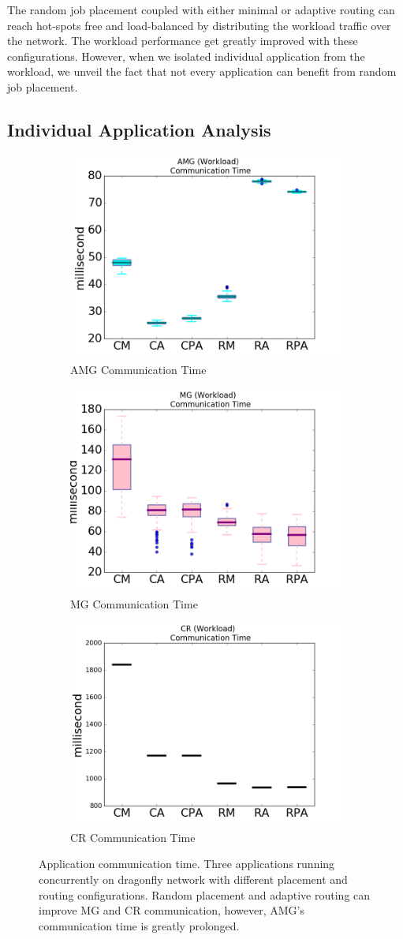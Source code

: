 \documentclass[conference,compsoc]{IEEEtran}
\begin{document}
The random job placement coupled with either minimal or adaptive routing can reach hot-spots free and load-balanced by distributing the workload traffic over the network. The workload performance get greatly improved with these configurations. However, when we isolated individual application from the workload, we unveil the fact that not every application can benefit from random job placement. 


\subsection{Individual Application Analysis}

\begin{figure}[t!]
    \centering
    \begin{subfigure}[t]{0.32\textwidth}
        \centering
        \includegraphics[height=1.5 in]{amg/commtime}
        \caption{AMG Communication Time}
        \label{fig:amg-commtime}
    \end{subfigure}%
    \hspace{1em}%
    \begin{subfigure}[t]{0.32\textwidth}
        \centering
        \includegraphics[height=1.5 in]{mg/commtime}
        \caption{MG Communication Time}
        \label{fig:mg-commtime}
    \end{subfigure}%
    \begin{subfigure}[t]{0.32\textwidth}
        \centering
        \includegraphics[height=1.5 in]{cr/commtime}
        \caption{CR Communication Time}
        \label{fig:cr-commtime}
    \end{subfigure}%
   \caption{Application communication time. Three applications running concurrently on dragonfly network with different placement and routing configurations. Random placement and adaptive routing can improve MG and CR communication, however, AMG's communication time is greatly prolonged.}
   \label{fig:apps-commtime}
\end{figure}
\end{document}
